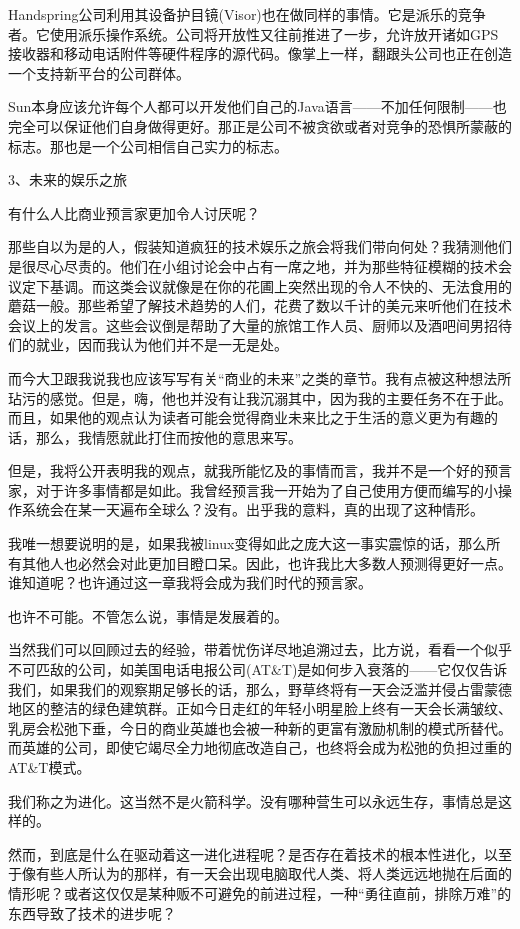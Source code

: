 Handspring公司利用其设备护目镜(Visor)也在做同样的事情。它是派乐的竞争者。它使用派乐操作系统。公司将开放性又往前推进了一步，允许放开诸如GPS接收器和移动电话附件等硬件程序的源代码。像掌上一样，翻跟头公司也正在创造一个支持新平台的公司群体。

Sun本身应该允许每个人都可以开发他们自己的Java语言——不加任何限制——也完全可以保证他们自身做得更好。那正是公司不被贪欲或者对竞争的恐惧所蒙蔽的标志。那也是一个公司相信自己实力的标志。

 
3、未来的娱乐之旅

有什么人比商业预言家更加令人讨厌呢？

那些自以为是的人，假装知道疯狂的技术娱乐之旅会将我们带向何处？我猜测他们是很尽心尽责的。他们在小组讨论会中占有一席之地，并为那些特征模糊的技术会议定下基调。而这类会议就像是在你的花圃上突然出现的令人不快的、无法食用的蘑菇一般。那些希望了解技术趋势的人们，花费了数以千计的美元来听他们在技术会议上的发言。这些会议倒是帮助了大量的旅馆工作人员、厨师以及酒吧间男招待们的就业，因而我认为他们并不是一无是处。

而今大卫跟我说我也应该写写有关“商业的未来”之类的章节。我有点被这种想法所玷污的感觉。但是，嗨，他也并没有让我沉溺其中，因为我的主要任务不在于此。而且，如果他的观点认为读者可能会觉得商业未来比之于生活的意义更为有趣的话，那么，我情愿就此打住而按他的意思来写。

但是，我将公开表明我的观点，就我所能忆及的事情而言，我并不是一个好的预言家，对于许多事情都是如此。我曾经预言我一开始为了自己使用方便而编写的小操作系统会在某一天遍布全球么？没有。出乎我的意料，真的出现了这种情形。

我唯一想要说明的是，如果我被linux变得如此之庞大这一事实震惊的话，那么所有其他人也必然会对此更加目瞪口呆。因此，也许我比大多数人预测得更好一点。谁知道呢？也许通过这一章我将会成为我们时代的预言家。

也许不可能。不管怎么说，事情是发展着的。

当然我们可以回顾过去的经验，带着忧伤详尽地追溯过去，比方说，看看一个似乎不可匹敌的公司，如美国电话电报公司(AT\&T)是如何步入衰落的——它仅仅告诉我们，如果我们的观察期足够长的话，那么，野草终将有一天会泛滥并侵占雷蒙德地区的整洁的绿色建筑群。正如今日走红的年轻小明星脸上终有一天会长满皱纹、乳房会松弛下垂，今日的商业英雄也会被一种新的更富有激励机制的模式所替代。而英雄的公司，即使它竭尽全力地彻底改造自己，也终将会成为松弛的负担过重的AT\&T模式。

我们称之为进化。这当然不是火箭科学。没有哪种营生可以永远生存，事情总是这样的。

然而，到底是什么在驱动着这一进化进程呢？是否存在着技术的根本性进化，以至于像有些人所认为的那样，有一天会出现电脑取代人类、将人类远远地抛在后面的情形呢？或者这仅仅是某种贩不可避免的前进过程，一种“勇往直前，排除万难”的东西导致了技术的进步呢？

